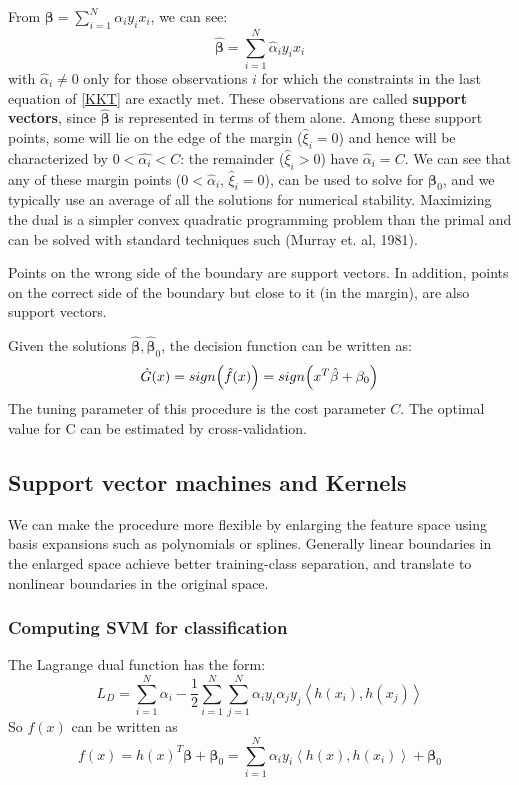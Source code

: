 \documentclass[12pt, letterpaper]{article}
\theoremstyle{definition}
\newcommand{\be}{\mathbf{\beta}}
\DeclarePairedDelimiter\autobracket{(}{)}
\newcommand{\br}[1]{\autobracket*{#1}}
\begin{document}
From $\be = \sum_{i=1}^N  \alpha_i y_i x_i$, we can see:
\begin{equation}
\hat{\be} = \sum_{i=1}^N \hat{\alpha}_i y_i x_i
\end{equation}
with $\hat{\alpha}_i \ne 0$ only for those observations $i$ for which the constraints in the last equation of \ref{KKT} are exactly met. These observations are called \textbf{support vectors}, since $\hat{\be}$ is represented in terms of them alone. Among these support points, some will lie on the edge of the margin ($\hat{\xi}_i=0$) and hence will be characterized by $0 < \hat{\alpha_i} <C$: the remainder ($\hat{\xi}_i>0$) have $\hat{\alpha}_i=C$. We can see that any of these margin points ($0<\hat{\alpha}_i$, $\hat{\xi}_i = 0$), can be used to solve for $\be_0$, and we typically use an average of all the solutions for numerical stability. Maximizing the dual is a simpler convex quadratic programming problem than the primal and can be solved with standard techniques such (Murray et. al, 1981).

Points on the wrong side of the boundary are support vectors. In addition, points on the correct side of the boundary but close to it (in the margin), are also support vectors. 

Given the solutions $\hat{\be}, \hat{\be}_0$, the decision function can be written as:
\begin{equation}
\hat{G} (x) = sign \br{\hat{f}(x)}= sign\br{x^T\hat{\be}+\be_0}
\end{equation}
The tuning parameter of this procedure is the cost parameter $C$. The optimal value for C can be estimated by cross-validation.
\subsection{Support vector machines and Kernels}
We can make the procedure more flexible by enlarging the feature space using basis expansions such as polynomials or splines. Generally linear boundaries in the enlarged space achieve better training-class separation, and translate to nonlinear boundaries in the original space. 

\subsubsection{Computing SVM for classification}
The Lagrange dual function has the form:
\begin{equation}
L_D = \sum_{i=1}^N \alpha_i - \frac{1}{2}\sum_{i=1}^N\sum_{j=1}^N \alpha_i y_i \alpha_j y_j\left\langle  h(x_i), h(x_j)  \right\rangle 
\end{equation}
So $f(x)$ can be written as 
\begin{equation}
f(x) = h(x)^T\be + \be_0 = \sum_{i=1}^N \alpha_iy_i \left\langle  h(x), h(x_i)  \right\rangle +\be_0
\end{equation}
\end{document}
